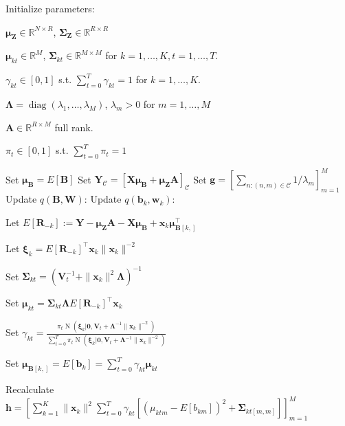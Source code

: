 \documentclass[11pt,authoryear]{article}
\DeclareMathOperator*{\diag}{diag}
\DeclareMathOperator*{\N}{N}
\newcommand{\bs}[1]{\boldsymbol{#1}}
\begin{document}
\begin{algorithm}
\begin{algorithmic}
  \STATE Initialize parameters:
  \begin{description}
  \item $\bs{\mu}_{\bs{Z}} \in \mathbb{R}^{N \times R}$, $\bs{\Sigma}_{\bs{Z}} \in \mathbb{R}^{R \times R}$
  \item $\bs{\mu}_{kt}\in\mathbb{R}^{M}$, $\bs{\Sigma}_{kt} \in \mathbb{R}^{M \times M}$ for $k = 1,\ldots,K, t = 1,\ldots, T$.
  \item $\gamma_{kt} \in [0, 1]$ s.t. $\sum_{t = 0}^T\gamma_{kt} = 1$ for $k = 1,\ldots,K$.
  \item $\bs{\Lambda} = \diag(\lambda_1,\ldots,\lambda_M)$, $\lambda_m > 0$ for $m = 1,\ldots,M$
  \item $\bs{A} \in \mathbb{R}^{R \times M}$ full rank.
  \item $\pi_t \in [0, 1]$ s.t. $\sum_{t = 0}^T\pi_t = 1$
  \end{description}
  \STATE Set $\bs{\mu}_{\bs{B}} = E[\bs{B}]$
  \STATE Set $\bs{Y}_{\mathcal{C}} = \left[\bs{X}\bs{\mu}_{\bs{B}} + \bs{\mu}_{\bs{Z}}\bs{A}\right]_{\mathcal{C}}$
  \STATE Set $\bs{g} = \left[\sum_{n: (n, m) \in \mathcal{C}} 1 / \lambda_m\right]_{m = 1}^M$
  \REPEAT
  \STATE Update $q(\bs{B},\bs{W})$:
  \STATE Update $q(\bs{b}_k,\bs{w}_k)$:
  \begin{description}
  \item Let $E[\bs{R}_{-k}] := \bs{Y} - \bs{\mu}_{\bs{Z}}\bs{A} - \bs{X}\bs{\mu}_{\bs{B}} + \bs{x}_k\bs{\mu}_{\bs{B}[k, ]}^{\intercal}$
  \item Let $\bs{\xi}_k = E\left[\bs{R}_{-k}\right]^{\intercal}\bs{x}_k\|\bs{x}_k\|^{-2}$
  \item Set $\bs{\Sigma}_{kt} = \left(\bs{V}_t^{-1} + \|\bs{x}_k\|^2\bs{\Lambda}\right)^{-1}$
  \item Set $\bs{\mu}_{kt} = \bs{\Sigma}_{kt}\bs{\Lambda}E\left[\bs{R}_{-k}\right]^{\intercal}\bs{x}_k$
  \item Set $\gamma_{kt} = \frac{\pi_t\N(\bs{\xi}_k|\bs{0}, \bs{V}_t + \bs{\Lambda}^{-1}\|\bs{x}_k\|^{-2})}{\sum_{t = 0}^T\pi_t\N(\bs{\xi}_k|\bs{0}, \bs{V}_t + \bs{\Lambda}^{-1}\|\bs{x}_k\|^{-2})}$
    \ENDFOR
  \item Set $\bs{\mu}_{\bs{B}[k, ]} = E[\bs{b}_{k}] = \sum_{t = 0}^T \gamma_{kt}\bs{\mu}_{kt}$
  \end{description}
  \ENDFOR
  \STATE Recalculate $\bs{h} = \left[\sum_{k = 1}^K\|\bs{x}_k\|^2\sum_{t = 0}^T\gamma_{kt}\left[\left(\mu_{ktm} - E[b_{km}]\right)^2 + \bs{\Sigma}_{kt[m, m]}\right]\right]_{m = 1}^{M}$

\end{algorithmic}
\end{algorithm}
\end{document}
